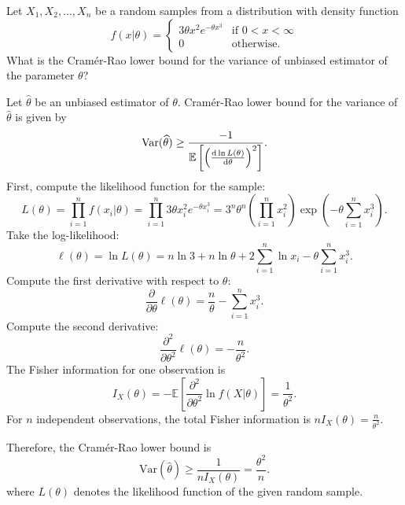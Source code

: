 \begin{example}
    Let $X_1, X_2, \ldots, X_n$ be a random samples from a distribution with density function
    \[
        f(x|\theta) = \begin{cases}
            3\theta x^2 e^{-\theta x^3} & \text{if } 0 < x < \infty\\
            0 & \text{otherwise}.
        \end{cases}
    \]
    What is the Cramér-Rao lower bound for the variance of unbiased estimator of the parameter $\theta$?
\end{example}
\begin{solution}
    Let $\widehat{\theta}$ be an unbiased estimator of $\theta$. Cramér-Rao lower bound for 
    the variance of $\widehat{\theta}$ is given by
    \[
        \text{Var}(\widehat{\theta}) \geq \frac{-1}{\mathbb{E} \left[ \left( \odv{\ln L(\theta)}{\theta} \right)^2 \right]}.
    \]
    First, compute the likelihood function for the sample:
    \[
        L(\theta) = \prod_{i=1}^n f(x_i|\theta) = \prod_{i=1}^n 3\theta x_i^2 e^{-\theta x_i^3} = 3^n \theta^n \left(\prod_{i=1}^n x_i^2\right) \exp\left(-\theta \sum_{i=1}^n x_i^3\right).
    \]
    Take the log-likelihood:
    \[
        \ell(\theta) = \ln L(\theta) = n\ln 3 + n\ln \theta + 2\sum_{i=1}^n \ln x_i - \theta \sum_{i=1}^n x_i^3.
    \]
    Compute the first derivative with respect to $\theta$:
    \[
        \frac{\partial}{\partial \theta} \ell(\theta) = \frac{n}{\theta} - \sum_{i=1}^n x_i^3.
    \]
    Compute the second derivative:
    \[
        \frac{\partial^2}{\partial \theta^2} \ell(\theta) = -\frac{n}{\theta^2}.
    \]
    The Fisher information for one observation is
    \[
        I_X(\theta) = -\mathbb{E}\left[\frac{\partial^2}{\partial \theta^2} \ln f(X|\theta)\right] = \frac{1}{\theta^2}.
    \]
    For $n$ independent observations, the total Fisher information is $n I_X(\theta) = \frac{n}{\theta^2}$.

    Therefore, the Cramér-Rao lower bound is
    \[
        \text{Var}(\widehat{\theta}) \geq \frac{1}{n I_X(\theta)} = \frac{\theta^2}{n}.
    \]
    where $L(\theta)$ denotes the likelihood function of the given random sample.
\end{solution}

